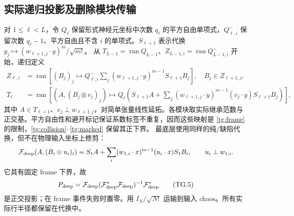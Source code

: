 \documentclass[a4paper]{tufte-handout}
\begin{document}
\begin{fullwidth}
\subsection{实际递归投影及删除模块传输}
对 $1\le\ell<L$，令 $Q_\ell$ 保留形式神经元坐标中次数 $q_\ell$ 的平方自由单项式，$Q^-_{\ell,i}$ 保留次数 $q_\ell-1$、平方自由且不含 $i$ 的单项式。$S_{\ell+1}$ 表示代换 $y_j\mapsto(w_{\ell+1,j}\cdot y)^m/\sqrt{m!}$。
从 $T_{L-1}=\operatorname{ran}Q_{L-1}$、$Z_{L-1,i}=\operatorname{ran}Q^-_{L-1,i}$ 开始，递归定义
\begin{align*}
 Z_{\ell,i}&=\operatorname{ran}\left[(B_j)_j\mapsto Q^-_{\ell,i}
     \sum_j(w_{\ell+1,j}\cdot y)^{m-1}S_{\ell+1}B_j\right],\quad B_j\in Z_{\ell+1,j},\\
 T_\ell&=\operatorname{ran}\left[(A,(B_j\otimes v_j)_j)\mapsto Q_\ell
  \left(S_{\ell+1}A+\sum_j(w_{\ell+1,j}\cdot y)^{m-1}(v_j\cdot y)S_{\ell+1}B_j\right)\right],
\end{align*}
其中 $A\in T_{\ell+1}$、$v_j\perp w_{\ell+1,j}$，对简单张量线性延拓。各模块取实际继承范数与正交基。平方自由性和避开标记保证系数标签不重复，因而这些映射是 \eqref{tg:frame} 的限制，\eqref{tg:collision}--\eqref{tg:marked} 保留其正下界。
最底层使用同样的纯/缺陷代换，但不在物理输入坐标上修剪：
\[
 \mathcal F_{\rm deep}(A,(B_i\otimes u_i)_i)
 =S_1A+\sum_i(w_{1,i}\cdot x)^{m-1}(u_i\cdot x)S_1B_i,\qquad u_i\perp w_{1,i}.
\]
它具有固定 frame 下界，故
\[
 P_{\rm deep}=\mathcal F_{\rm deep}(\mathcal F_{\rm deep}^*\mathcal F_{\rm deep})^{-1}\mathcal F_{\rm deep}^*
 \tag{TG.5}
\]
是正交投影；在 frame 事件失败时置零。用 $I_N/\sqrt{N!}$ 运输到输入 chaos。所有实际行半径都保留在代换中。


\end{fullwidth}
\end{document}
